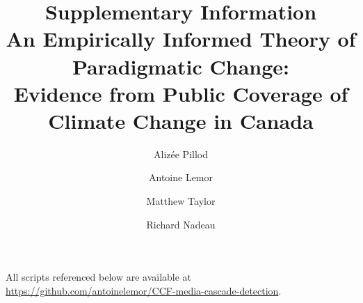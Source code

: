 \documentclass[11pt]{article}
\title{\textbf{Supplementary Information}\\[0.5em]
\large An Empirically Informed Theory of Paradigmatic Change:\\
Evidence from Public Coverage of Climate Change in Canada}
\author[1]{Aliz\'{e}e Pillod}
\author[2]{Antoine Lemor}
\author[1]{Matthew Taylor}
\author[1]{Richard Nadeau}
\affil[1]{Universit\'{e} de Montr\'{e}al}
\affil[2]{Universit\'{e} de Sherbrooke}
\date{}
\begin{document}
\maketitle

All scripts referenced below are available at\\
\url{https://github.com/antoinelemor/CCF-media-cascade-detection}.


\end{document}
